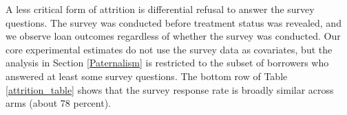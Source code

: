 \begin{appendix}
A less critical form of attrition is differential refusal to answer the survey questions.  The survey was conducted before treatment status was revealed, and we observe loan outcomes regardless of whether the survey was conducted.  Our core experimental estimates do not use the survey data as covariates, but the analysis in Section \ref{Paternalism} is restricted to the subset of borrowers who answered at least some survey questions. The bottom row of Table \ref{attrition_table} shows that the survey response rate is broadly similar across arms (about 78 percent). 







\end{appendix}
